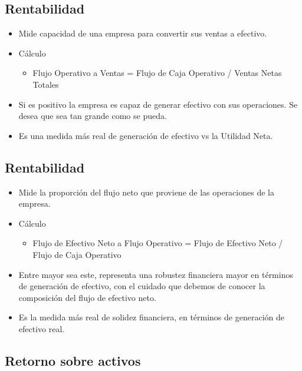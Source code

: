 \subsection{Rentabilidad}

\begin{itemize}
    \item Mide capacidad de una empresa para convertir sus ventas a efectivo. 
    \item Cálculo 
    \begin{itemize}
        \item Flujo Operativo a Ventas =  Flujo de Caja Operativo / Ventas Netas Totales 
    \end{itemize}
    \item Si es positivo la empresa es capaz de generar efectivo con sus operaciones. Se desea que sea tan grande como se pueda. 
    \item Es una medida más real de generación de efectivo vs la Utilidad Neta.
\end{itemize}

\subsection{Rentabilidad}

\begin{itemize}
    \item  Mide la proporción del flujo neto que proviene de las operaciones de la empresa. 
    \item Cálculo 
    \begin{itemize}
        \item Flujo de Efectivo Neto a Flujo Operativo = Flujo de Efectivo Neto / Flujo de Caja Operativo 
    \end{itemize}

    \item Entre mayor sea este, representa una robustez financiera mayor en términos de generación de efectivo, con el cuidado que debemos de conocer la composición del flujo de efectivo neto. 
     
    \item Es  la  medida  más  real  de  solidez  financiera,  en  términos  de  generación  de efectivo real.
\end{itemize}


\subsection{Retorno sobre activos}

